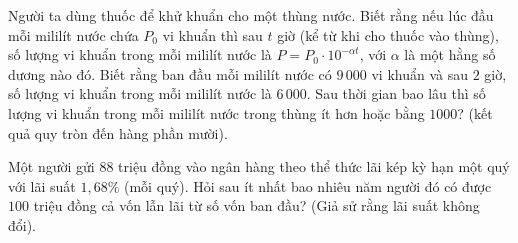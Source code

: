 \begin{bt}%
Người ta dùng thuốc để khử khuẩn cho một thùng nước. Biết rằng nếu lúc đầu mỗi mililít nước chứa $P_0$ vi khuẩn thì sau $ t$ giờ (kể từ khi cho thuốc vào thùng), số lượng vi khuẩn trong mỗi mililít nước là $ P=P_0\cdot{10^{-\alpha t}}$, với $\alpha $ là một hằng số dương nào đó. Biết rằng ban đầu mỗi mililít nước có $9\,000$ vi khuẩn và sau $2$ giờ, số lượng vi khuẩn trong mỗi mililít nước là $6\,000$. Sau thời gian bao lâu thì số lượng vi khuẩn trong mỗi mililít nước trong thùng ít hơn hoặc bằng $1000$? (kết quả quy tròn đến hàng phần mười).
\end{bt}

\begin{bt}%
Một người gửi $88$ triệu đồng vào ngân hàng theo thể thức lãi kép kỳ hạn một quý với lãi suất $1{,}68\%$ (mỗi quý). Hỏi sau ít nhất bao nhiêu năm người đó có được $100$ triệu đồng cả vốn lẫn lãi từ số vốn ban đầu? (Giả sử rằng lãi suất không đổi).
\par
{}
\end{bt}

